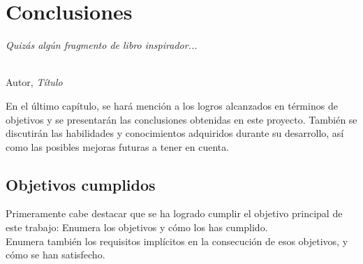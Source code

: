 \chapter{Conclusiones}
\label{cap:capitulo7}

\begin{flushright}
\begin{minipage}[]{10cm}
\emph{Quizás algún fragmento de libro inspirador...}\\
\end{minipage}\\

Autor, \textit{Título}\\
\end{flushright}

\vspace{1cm}

En el último capítulo, se hará mención a los logros alcanzados en términos de objetivos y se presentarán 
las conclusiones obtenidas en este proyecto. También se discutirán las habilidades y conocimientos 
adquiridos durante su desarrollo, así como las posibles mejoras futuras a tener en cuenta.
\section{Objetivos cumplidos}
Primeramente cabe destacar que se ha logrado cumplir el objetivo principal de este trabajo:
Enumera los objetivos y cómo los has cumplido.\\

Enumera también los requisitos implícitos en la consecución de esos objetivos, y cómo se han satisfecho.\\
